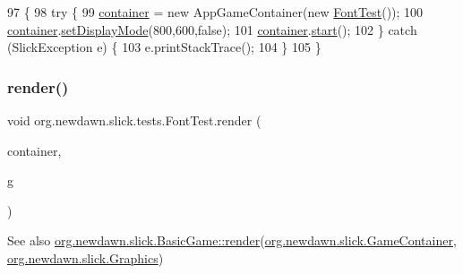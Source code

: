 \begin{DoxyCode}
97                                            \{
98         \textcolor{keywordflow}{try} \{
99             \mbox{\hyperlink{classorg_1_1newdawn_1_1slick_1_1tests_1_1_font_test_a752b5206f834ae0b0205d67dcb2aa18d}{container}} = \textcolor{keyword}{new} AppGameContainer(\textcolor{keyword}{new} \mbox{\hyperlink{classorg_1_1newdawn_1_1slick_1_1tests_1_1_font_test_acf10f3c52363190d6336752a54cd1ceb}{FontTest}}());
100             \mbox{\hyperlink{classorg_1_1newdawn_1_1slick_1_1tests_1_1_font_test_a752b5206f834ae0b0205d67dcb2aa18d}{container}}.\mbox{\hyperlink{classorg_1_1newdawn_1_1slick_1_1_app_game_container_aa2de68db61ddd3917a8edc0177ebdfe3}{setDisplayMode}}(800,600,\textcolor{keyword}{false});
101             \mbox{\hyperlink{classorg_1_1newdawn_1_1slick_1_1tests_1_1_font_test_a752b5206f834ae0b0205d67dcb2aa18d}{container}}.\mbox{\hyperlink{classorg_1_1newdawn_1_1slick_1_1_app_game_container_adcadc0e560e64d03be24c817931fdd54}{start}}();
102         \} \textcolor{keywordflow}{catch} (SlickException e) \{
103             e.printStackTrace();
104         \}
105     \}
\end{DoxyCode}
\mbox{\label{classorg_1_1newdawn_1_1slick_1_1tests_1_1_font_test_a0903a2695553591dcbc042abbe4f6052}} 
\subsubsection{\texorpdfstring{render()}{render()}}
{\footnotesize\ttfamily void org.\+newdawn.\+slick.\+tests.\+Font\+Test.\+render (\begin{DoxyParamCaption}\item[{\mbox{\hyperlink{classorg_1_1newdawn_1_1slick_1_1_game_container}{Game\+Container}}}]{container,  }\item[{\mbox{\hyperlink{classorg_1_1newdawn_1_1slick_1_1_graphics}{Graphics}}}]{g }\end{DoxyParamCaption})\hspace{0.3cm}{\ttfamily [inline]}}

\begin{DoxySeeAlso}{See also}
\mbox{\hyperlink{interfaceorg_1_1newdawn_1_1slick_1_1_game_af1a4670d43eb3ba04dfcf55ab1975b64}{org.\+newdawn.\+slick.\+Basic\+Game\+::render}}(\mbox{\hyperlink{classorg_1_1newdawn_1_1slick_1_1_game_container}{org.\+newdawn.\+slick.\+Game\+Container}}, \mbox{\hyperlink{classorg_1_1newdawn_1_1slick_1_1_graphics}{org.\+newdawn.\+slick.\+Graphics}}) 
\end{DoxySeeAlso}


